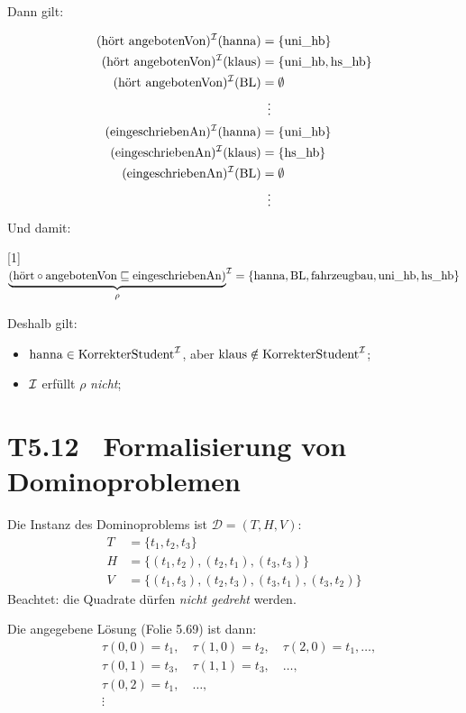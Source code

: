 \documentclass[fontsize=11pt, twoside=false, numbers=autoenddot]{scrbook}
\begin{document}
Dann gilt: 

\begin{align*}
  (\text{hört}\ \text{angebotenVon})^\mathcal{I}(\text{hanna}) &=
  \{\text{uni$\_$hb}\} \\
  (\text{hört}\ \text{angebotenVon})^\mathcal{I}(\text{klaus}) &=
  \{\text{uni$\_$hb},\text{hs$\_$hb}\} \\
  (\text{hört}\ \text{angebotenVon})^\mathcal{I}(\text{BL}) &= \emptyset \\
  & ~\vdots \\
  (\text{eingeschriebenAn})^\mathcal{I}(\text{hanna}) &=
  \{\text{uni$\_$hb}\} \\
  (\text{eingeschriebenAn})^\mathcal{I}(\text{klaus}) &=
  \{\text{hs$\_$hb}\} \\
  (\text{eingeschriebenAn})^\mathcal{I}(\text{BL}) &= \emptyset
  \\
  & ~\vdots
\end{align*}
%
Und damit:

\parI
\scalebox{.98}[1]{%
${\underbrace{(\text{hört}\circ\text{angebotenVon}\sqsubseteq
  \text{eingeschriebenAn})}_{\rho}}^\mathcal{I} =
\{\text{hanna},\text{BL},\text{fahrzeugbau},\text{uni$\_$hb},\text{hs$\_$hb}\}$
}

\parI
Deshalb gilt:
%
\begin{itemize}

  \item $\text{hanna}\in \text{KorrekterStudent}^\mathcal{I}$, aber
    $\text{klaus}\notin \text{KorrekterStudent}^\mathcal{I}$;

  \item $\mathcal{I}$ erfüllt $\rho$ \emph{nicht};


\end{itemize}


\section*{T5.12~ Formalisierung von Dominoproblemen}

Die Instanz des Dominoproblems ist $\mathcal{D} = (T,H,V)$: 
%
\begin{align*}
  T & =\{t_1,t_2,t_3\} \\
  H & = \{(t_1,t_2), (t_2,t_1), (t_3,t_3) \} \\
  V & = \{(t_1,t_3), (t_2,t_3), (t_3,t_1), (t_3,t_2) \}
\end{align*}
%
Beachtet: die Quadrate dürfen \emph{nicht gedreht} werden. 

Die angegebene Lösung (Folie 5.69) ist dann: 
%
\begin{align*}
  &\tau(0,0) = t_1, \quad\tau(1,0)=t_2, \quad\tau(2,0)=t_1,\ldots, \\
  &\tau(0,1) = t_3, \quad\tau(1,1)=t_3, \quad\ldots, \\
  &\tau(0,2) = t_1, \quad\ldots, \\
  & \vdots
\end{align*}
\end{document}
